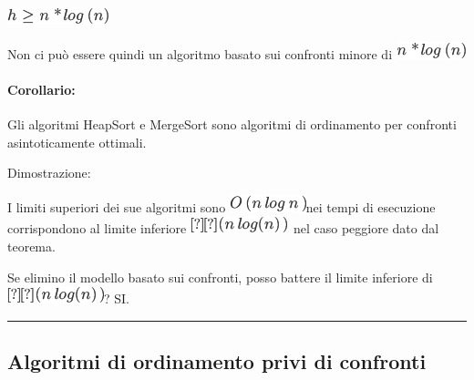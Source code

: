 \documentclass{article}
\let\oldparagraph\paragraph
\renewcommand{\paragraph}[1]{\oldparagraph{#1}\mbox{}}
\begin{document}
{\includegraphics{images/image179.png}

{Non ci può essere quindi un algoritmo basato sui confronti minore di }\includegraphics{images/image180.png}

\hypertarget{h.emyylm3q4aq8}{\paragraph{\texorpdfstring{{Corollario:}}{Corollario:}}\label{h.emyylm3q4aq8}}

{Gli algoritmi HeapSort e MergeSort sono algoritmi di ordinamento per confronti asintoticamente ottimali.}

{Dimostrazione:}

{I limiti superiori dei sue algoritmi sono }\includegraphics{images/image181.png}{nei tempi di esecuzione
corrispondono al limite inferiore }\includegraphics{images/image153.png}{~nel caso peggiore dato dal
teorema.}

{Se elimino il modello basato sui confronti, posso battere il limite
inferiore di }\includegraphics{images/image153.png}{? SI.}

\begin{center}\rule{0.5\linewidth}{\linethickness}\end{center}

\subsection{\texorpdfstring{{}}{}}\label{h.9sera6op4yxc}

\hypertarget{h.p17586cst16}{\subsection{\texorpdfstring{{Algoritmi di
ordinamento privi di
confronti}}{Algoritmi di ordinamento privi di confronti}}\label{h.p17586cst16}}

}
\end{document}
